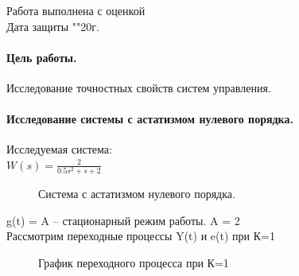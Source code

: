 \documentclass[a4paper, 11pt]{article}
\begin{document}
\begin{titlepage}
		Работа выполнена с оценкой \hspace{0.5cm} \underline{\hspace{10cm}} \\ 
		\vspace{1cm}
		Дата защиты "\underline{\hspace{0.4cm}}"\hspace{0.1cm}\underline{\hspace{1.5cm}}\hspace{0.1cm}20\underline{\hspace{0.4cm}}г.
		
	\end{titlepage}
\paragraph{Цель работы.}Исследование точностных свойств систем управления.
\paragraph{Исследование системы с астатизмом нулевого порядка.}Исследуемая система:\\
\large{$W(s)= \frac {2} {0.5s^2+s+2}$}

\begin{figure}[h]
    \caption{Система с астатизмом нулевого порядка.}
    \label{one}
\end{figure}

g(t) = A – стационарный режим работы. A = 2\\

Рассмотрим переходные процессы Y(t) и e(t) при К=1

\begin{figure}[h!]
    \caption{График переходного процесса при К=1}
    \label{two}
\end{figure}
\end{document}
